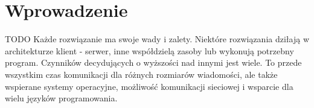 \chapter{Wprowadzenie}

TODO
Każde rozwiązanie ma swoje wady i zalety. Niektóre rozwiązania dziłają w architekturze klient - serwer, inne współdzielą zasoby lub wykonują potrzebny program. Czynników decydujących o wyższości nad innymi jest wiele. To przede wszystkim czas komunikacji dla różnych rozmiarów wiadomości, ale także wspierane systemy operacyjne, możliwość komunikacji sieciowej i wsparcie dla wielu języków programowania.
